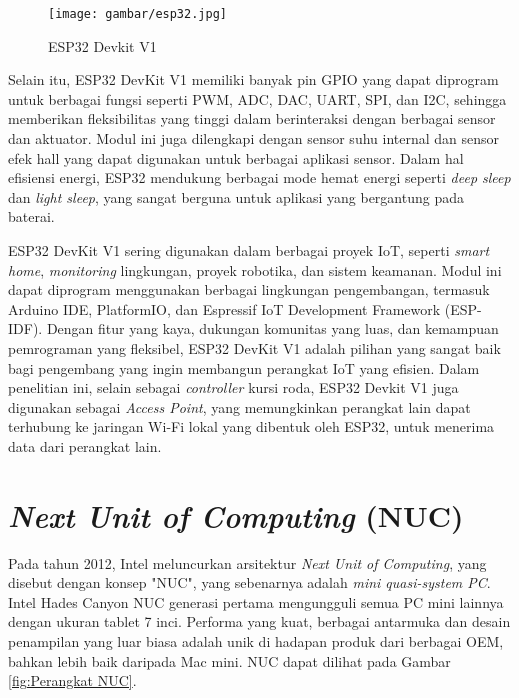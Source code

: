 \begin{figure} [ht] \centering
  \texttt{[image: gambar/esp32.jpg]}
  \caption{ESP32 Devkit V1}
  \label{fig:esp32}
\end{figure}

Selain itu, ESP32 DevKit V1 memiliki banyak pin GPIO yang dapat diprogram untuk berbagai fungsi seperti PWM, ADC, DAC, UART, SPI, dan I2C, sehingga memberikan fleksibilitas yang tinggi dalam berinteraksi dengan berbagai sensor dan aktuator. Modul ini juga dilengkapi dengan sensor suhu internal dan sensor efek hall yang dapat digunakan untuk berbagai aplikasi sensor. Dalam hal efisiensi energi, ESP32 mendukung berbagai mode hemat energi seperti \emph{deep sleep} dan \emph{light sleep}, yang sangat berguna untuk aplikasi yang bergantung pada baterai.

ESP32 DevKit V1 sering digunakan dalam berbagai proyek IoT, seperti \emph{smart home}, \emph{monitoring} lingkungan, proyek robotika, dan sistem keamanan. Modul ini dapat diprogram menggunakan berbagai lingkungan pengembangan, termasuk Arduino IDE, PlatformIO, dan Espressif IoT Development Framework (ESP-IDF). Dengan fitur yang kaya, dukungan komunitas yang luas, dan kemampuan pemrograman yang fleksibel, ESP32 DevKit V1 adalah pilihan yang sangat baik bagi pengembang yang ingin membangun perangkat IoT yang efisien. Dalam penelitian ini, selain sebagai \emph{controller} kursi roda, ESP32 Devkit V1 juga digunakan sebagai \emph{Access Point}, yang memungkinkan perangkat lain dapat terhubung ke jaringan Wi-Fi lokal yang dibentuk oleh ESP32, untuk menerima data dari perangkat lain.

\section{\textit{Next Unit of Computing} (NUC)}

Pada tahun 2012, Intel meluncurkan arsitektur \textit{Next Unit of Computing}, yang disebut dengan konsep "NUC", yang sebenarnya adalah \textit{mini quasi-system PC}. Intel Hades Canyon NUC generasi pertama mengungguli semua PC mini lainnya dengan ukuran tablet 7 inci. Performa yang kuat, berbagai antarmuka dan desain penampilan yang luar biasa adalah unik di hadapan produk dari berbagai OEM, bahkan lebih baik daripada Mac mini\parencite{8858650}. NUC dapat dilihat pada Gambar \ref{fig:Perangkat NUC}.

